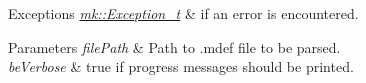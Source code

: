 \begin{DoxyExceptions}{Exceptions}
{\em \hyperlink{classmk_1_1_exception__t}{mk\+::\+Exception\+\_\+t}} & if an error is encountered. \\
\hline
\end{DoxyExceptions}

\begin{DoxyParams}{Parameters}
{\em file\+Path} & Path to .mdef file to be parsed. \\
\hline
{\em be\+Verbose} & true if progress messages should be printed. \\
\hline
\end{DoxyParams}
